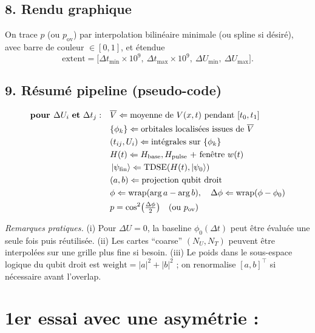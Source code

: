 \documentclass{article}
\begin{document}
\subsection*{8. Rendu graphique}
On trace $p$ (ou $p_{\text{ov}}$) par interpolation bilinéaire minimale (ou spline si désiré), avec barre de couleur $\in[0,1]$, et étendue
\[
\text{extent}=\big[\Delta t_{\min}\!\times\!10^9,\ \Delta t_{\max}\!\times\!10^9,\ \Delta U_{\min},\ \Delta U_{\max}\big].
\]

\subsection*{9. Résumé pipeline (pseudo-code)}
\begin{align*}
\textbf{pour } \Delta U_i \ \textbf{et}\ \Delta t_j:\quad
&\overline{V}\Leftarrow \text{moyenne de }V(x,t)\ \text{pendant }[t_0,t_1] \\
&\{\phi_k\}\Leftarrow \text{orbitales localisées issues de } \overline{V} \\
&(t_{ij},U_i)\Leftarrow \text{intégrales sur }\{\phi_k\} \\
&H(t)\Leftarrow H_{\text{base}},H_{\text{pulse}} \text{ + fenêtre } w(t) \\
&\ket{\psi_{\text{fin}}}\Leftarrow \text{TDSE}(H(t),\ket{\psi_0}) \\
&(a,b)\Leftarrow \text{projection qubit droit} \\
&\phi\Leftarrow \operatorname{wrap}(\arg a-\arg b),\quad
\Delta\phi\Leftarrow \operatorname{wrap}(\phi-\phi_0) \\
&p=\cos^2\!\big(\tfrac{\Delta\phi}{2}\big)\quad\text{(ou }p_{\text{ov}}\text{)}
\end{align*}

\noindent\textit{Remarques pratiques.} 
(i) Pour $\Delta U=0$, la baseline $\phi_0(\Delta t)$ peut être évaluée une seule fois puis réutilisée.
(ii) Les cartes “coarse” $(N_U,N_T)$ peuvent être interpolées sur une grille plus fine si besoin.
(iii) Le poids dans le sous-espace logique du qubit droit est $\mathrm{weight}=|a|^2+|b|^2$ ; on renormalise $[a,b]^\top$ si nécessaire avant l’overlap.



\section*{1er essai avec une asymétrie :}
\end{document}

